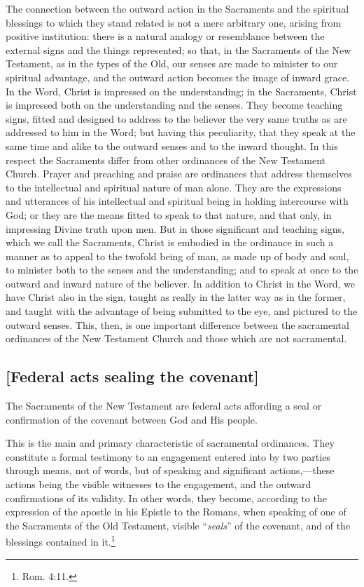 \documentclass[
  english,
]{book}
\begin{document}
The connection between the outward action in the Sacraments and the spiritual blessings to which they stand related is not a mere arbitrary one, arising from positive institution: there is a natural analogy or resemblance between the external signs and the things represented; so that, in the Sacraments of the New Testament, as in the types of the Old, our senses are made to minister to our spiritual advantage, and the outward action becomes the image of inward grace. In the Word, Christ is impressed on the understanding; in the Sacraments, Christ is impressed both on the understanding and the senses. They become teaching signs, fitted and designed to address to the believer the very same truths as are addressed to him in the Word; but having this peculiarity, that they speak at the same time and alike to the outward senses and to the inward thought. In this respect the Sacraments differ from other ordinances of the New Testament Church. Prayer and preaching and praise are ordinances that address themselves to the intellectual and spiritual nature of man alone. They are the expressions and utterances of his intellectual and spiritual being in holding intercourse with God; or they are the means fitted to speak to that nature, and that only, in impressing Divine truth upon men. But in those significant and teaching signs, which we call the Sacraments, Christ is embodied in the ordinance in such a manner as to appeal to the twofold being of man, as made up of body and soul, to minister both to the senses and the understanding; and to speak at once to the outward and inward nature of the believer. In addition to Christ in the Word, we have Christ also in the sign, taught as really in the latter way as in the former, and taught with the advantage of being submitted to the eye, and pictured to the outward senses. This, then, is one important difference between the sacramental ordinances of the New Testament Church and those which are not sacramental.

\hypertarget{federal-acts-sealing-the-covenant}{%
\subsection{{[}Federal acts sealing the covenant{]}}\label{federal-acts-sealing-the-covenant}}

The Sacraments of the New Testament are federal acts affording a seal or confirmation of the covenant between God and His people.

This is the main and primary characteristic of sacramental ordinances. They constitute a formal testimony to an engagement entered into by two parties through means, not of words, but of speaking and significant actions,---these actions being the visible witnesses to the engagement, and the outward confirmations of its validity. In other words, they become, according to the expression of the apostle in his Epistle to the Romans, when speaking of one of the Sacraments of the Old Testament, visible ``\emph{seals}'' of the covenant, and of the blessings contained in it.\footnote{Rom. 4:11.}
\end{document}
